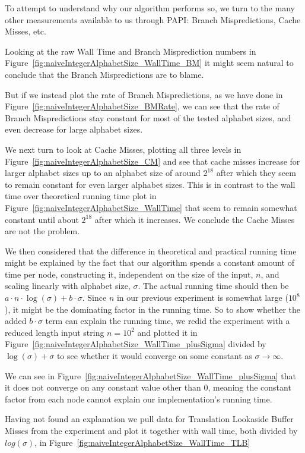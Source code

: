 To attempt to understand why our algorithm performs so, we turn to the many other measurements available to us through PAPI: Branch Mispredictions, Cache Misses, etc.

Looking at the raw Wall Time and Branch Misprediction numbers in Figure~\ref{fig:naiveIntegerAlphabetSize_WallTime_BM} it might seem natural to conclude that the Branch Mispredictions are to blame.

But if we instead plot the rate of Branch Mispredictions, as we have done in Figure~\ref{fig:naiveIntegerAlphabetSize_BMRate}, we can see that the rate of Branch Mispredictions stay constant for most of the tested alphabet sizes, and even decrease for large alphabet sizes.

We next turn to look at Cache Misses, plotting all three levels in Figure~\ref{fig:naiveIntegerAlphabetSize_CM} and see that cache misses increase for larger alphabet sizes up to an alphabet size of around $2^{18}$ after which they seem to remain constant for even larger alphabet sizes.
This is in contrast to the wall time over theoretical running time plot in Figure~\ref{fig:naiveIntegerAlphabetSize_WallTime} that seem to remain somewhat constant until about $2^{18}$ after which it increases.
We conclude the Cache Misses are not the problem.

We then considered that the difference in theoretical and practical running time might be explained by the fact that our algorithm spends a constant amount of time per node, constructing it, independent on the size of the input, $n$, and scaling linearly with alphabet size, $\sigma$.
The actual running time should then be $a \cdot n \cdot \log(\sigma) + b \cdot \sigma$.
Since $n$ in our previous experiment is somewhat large ($10^8$), it might be the dominating factor in the running time.
So to show whether the added $b \cdot \sigma$ term can explain the running time, we redid the experiment with a reduced length input string $n = 10^2$ and plotted it in Figure~\ref{fig:naiveIntegerAlphabetSize_WallTime_plusSigma} divided by $\log(\sigma) + \sigma$ to see whether it would converge on some constant as $\sigma \rightarrow \infty$.

We can see in Figure~\ref{fig:naiveIntegerAlphabetSize_WallTime_plusSigma} that it does not converge on any constant value other than 0, meaning the constant factor from each node cannot explain our implementation's running time.

Having not found an explanation we pull data for Translation Lookaside Buffer Misses from the experiment and plot it together with wall time, both divided by $log(\sigma)$, in Figure~\ref{fig:naiveIntegerAlphabetSize_WallTime_TLB}




